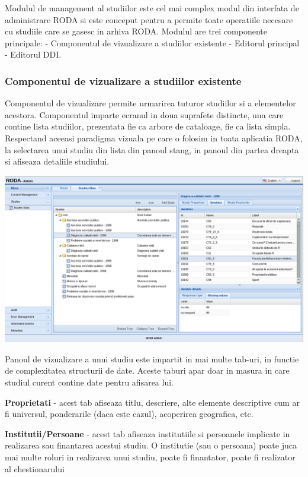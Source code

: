 Modulul de management al studiilor este cel mai complex modul din interfata de administrare RODA  si este conceput pentru a permite toate operatiile necesare cu studiile care se gasesc in arhiva RODA. Modulul are trei componente principale: 
    - Componentul de vizualizare a studiilor existente
    - Editorul principal
    - Editorul DDI. 

\subsubsection{Componentul de vizualizare a studiilor existente}

Componentul de vizualizare permite urmarirea tuturor studiilor si a elementelor acestora. Componentul imparte ecranul in doua suprafete distincte, una care contine lista studiilor, prezentata fie ca arbore de cataloage, fie ca lista simpla. Respectand aceeasi paradigma vizuala pe care o folosim in toata aplicatia RODA, la selectarea unui studiu din lista din panoul stang, in panoul din partea dreapta si afiseaza detaliile studiului. 

\includegraphics[width=16cm]{img/study-tree-compl}

Panoul de vizualizare a unui studiu este impartit in mai multe tab-uri, in functie de complexitatea structurii de date. Aceste taburi apar doar in masura in care studiul curent contine date pentru afisarea lui. 
 
\textbf{Proprietati} - acest tab afiseaza titlu, descriere, alte elemente descriptive cum ar fi universul, ponderarile (daca este cazul), acoperirea geografica, etc. 

\textbf{Institutii/Persoane} - acest tab afiseaza institutiile si persoanele implicate in realizarea sau finantarea acestui studiu. O institutie (sau o persoana) poate juca mai multe roluri in realizarea unui studiu, poate fi finantator, poate fi realizator al chestionarului

